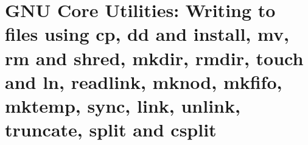 
\chapter{GNU Core Utilities: Writing to files using cp, dd and install, mv, rm and shred, mkdir, rmdir, touch and ln, readlink, mknod, mkfifo, mktemp, sync, link, unlink, truncate, split and csplit}

